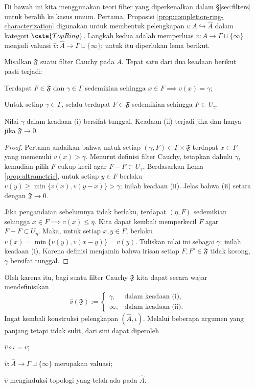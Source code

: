Di bawah ini kita menggunakan teori filter yang diperkenalkan dalam \S\ref{sec:filters} untuk beralih ke kasus umum. Pertama, Proposisi \ref{prop:completion-ring-characterization} digunakan untuk membentuk pelengkapan $\iota: A \hookrightarrow \hat{A}$ dalam kategori $\cate{TopRing}$. Langkah kedua adalah memperluas $v: A \to \Gamma \sqcup \{\infty\}$ menjadi valuasi $\hat{v}: \hat{A} \to \Gamma \sqcup \{\infty\}$; untuk itu diperlukan lema berikut.

\begin{lemma}\label{prop:valuation-of-Cauchy-filter}
	Misalkan $\mathfrak{F}$ suatu filter Cauchy pada $A$. Tepat satu dari dua keadaan berikut pasti terjadi:
	\begin{compactenum}[(i)]
		\item Terdapat $F \in \mathfrak{F}$ dan $\gamma \in \Gamma$ sedemikian sehingga $x \in F \implies v(x) = \gamma$;
		\item Untuk setiap $\gamma \in \Gamma$, selalu terdapat $F \in \mathfrak{F}$ sedemikian sehingga $F \subset U_\gamma$.
	\end{compactenum}
	Nilai $\gamma$ dalam keadaan (i) bersifat tunggal. Keadaan (ii) terjadi jika dan hanya jika $\mathfrak{F} \to 0$.
\end{lemma}
\begin{proof}
	Pertama andaikan bahwa untuk setiap $(\gamma, F) \in \Gamma \times \mathfrak{F}$ terdapat $x \in F$ yang memenuhi $v(x) > \gamma$. Menurut definisi filter Cauchy, tetapkan dahulu $\gamma$, kemudian pilih $F$ cukup kecil agar $F-F \subset U_\gamma$. Berdasarkan Lema \ref{prop:ultrametric}, untuk setiap $y \in F$ berlaku $v(y) \geq \min\{v(x), v(y-x) \} > \gamma$; inilah keadaan (ii). Jelas bahwa (ii) setara dengan $\mathfrak{F} \to 0$.

	Jika pengandaian sebelumnya tidak berlaku, terdapat $(\eta, F)$ sedemikian sehingga $x \in F \implies v(x) \leq \eta$. Kita dapat kembali memperkecil $F$ agar $F-F \subset U_\eta$. Maka, untuk setiap $x,y \in F$, berlaku $v(x) = \min\{v(y), v(x-y) \} = v(y)$. Tuliskan nilai ini sebagai $\gamma$; inilah keadaan (i). Karena definisi menjamin bahwa irisan setiap $F, F' \in \mathfrak{F}$ tidak kosong, $\gamma$ bersifat tunggal.
\end{proof}

Oleh karena itu, bagi suatu filter Cauchy $\mathfrak{F}$ kita dapat secara wajar mendefinisikan
\[ \hat{v}(\mathfrak{F}) := \begin{cases}
	\gamma, & \text{dalam keadaan (i)}, \\
	\infty, & \text{dalam keadaan (ii)}.
\end{cases}\]
Ingat kembali konstruksi pelengkapan $(\hat{A}, \iota)$. Melalui beberapa argumen yang panjang tetapi tidak sulit, dari sini dapat diperoleh
\begin{compactitem}
	\item $\hat{v} \circ \iota = v$;
	\item $\hat{v}: \hat{A} \to \Gamma \sqcup \{\infty\}$ merupakan valuasi;
	\item $\hat{v}$ menginduksi topologi yang telah ada pada $\hat{A}$.
\end{compactitem}

